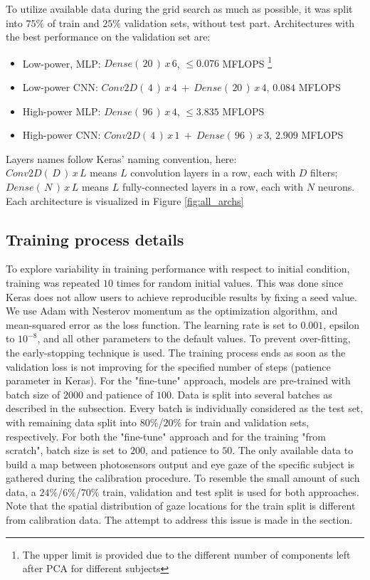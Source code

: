 To utilize available data during the grid search as much as possible, it was split into $75\%$ of train and $25\%$ validation sets, without test part. Architectures with the best performance on the validation set are:
\begin{itemize}
    \item Low-power, MLP: $Dense(\, 20\, )\, x\, 6$, $\leq0.076$ MFLOPS \footnote{The upper limit is provided due to the different number of components left after PCA for different subjects\label{mlp_note}} 
    \item Low-power CNN: $Conv2D(\, 4\, )\, x\, 4\: +\: Dense(\, 20\, )\, x\, 4$, $0.084$ MFLOPS
    \item High-power MLP: $Dense(\, 96\, )\, x\, 4$, $\leq3.835$ MFLOPS 
    \item High-power CNN: $Conv2D(\, 4\, )\, x\, 1\: +\: Dense(\, 96\, )\, x\, 3$, $2.909$ MFLOPS
\end{itemize}
Layers names follow Keras' naming convention, here: \\ $Conv2D(\, D\, )\, x\, L$ means $L$ convolution layers in a row, each with $D$ filters; $Dense(\, N\, )\, x\, L$ means $L$ fully-connected layers in a row, each with $N$ neurons. Each architecture is visualized in Figure \ref{fig:all_archs}

\subsection{Training process details}

To explore variability in training performance with respect to initial condition, training was repeated $10$ times for random initial values. This was done since Keras does not allow users to achieve reproducible results by fixing a seed value. 
We use Adam with Nesterov momentum \cite{dozat2016incorporating} as the optimization algorithm, and mean-squared error as the loss function. The learning rate is set to $0.001$, epsilon to $10^{-8}$, and all other parameters to the default values. To prevent over-fitting, the early-stopping \cite{caruana2001overfitting} technique is used. The training process ends as soon as the validation loss is not improving for the specified number of steps (patience parameter in Keras). For the "fine-tune" approach, models are pre-trained with batch size of $2000$ and patience of $100$. Data is split into several batches as described in the  subsection. Every batch is individually considered as the test set, with remaining data split into $80$\%/$20$\% for train and validation sets, respectively. For both the "fine-tune" approach and for the training "from scratch", batch size is set to $200$, and patience to $50$. The only available data to build a map between photosensors output and eye gaze of the specific subject is gathered during the calibration procedure. To resemble the small amount of such data, a $24$\%/$6$\%/$70$\% train, validation and test split is used for both approaches. Note that the spatial distribution of gaze locations for the train split is different from calibration data. The attempt to address this issue is made in the  section.

